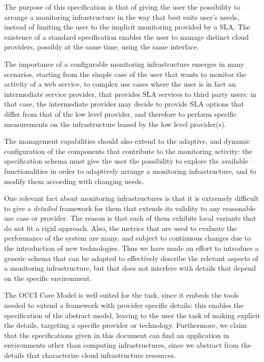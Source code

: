 \documentclass[12pt]{article}  %
\begin{document}
The purpose of this specification is that of giving the user the possibility to arrange a monitoring infrastructure in the way that best suits user's needs, instead of limiting the user to the implicit monitoring provided by a SLA. The existence of a standard specification enables the user to manage distinct cloud providers, possibly at the same time, using the same interface.

The importance of a configurable monitoring infrastructure emerges in many scenarios, starting from the simple case of the user that wants to monitor the activity of a web service, to complex use cases where the user is in fact an intermediate service provider, that provides SLA services to third party users: in that case, the intermediate provider may decide to provide SLA options that differ from that of the low level provider, and therefore to perform specific measurements on the infrastructure leased by the low level provider(s).

The management capabilities should also extend to the adaptive, and dynamic configuration of the components that contribute to the monitoring activity: the specification schema must give the user the possibility to explore the available functionalities in order to adaptively arrange a monitoring infrastructure, and to modify them according with changing needs.

One relevant fact about monitoring infrastructures is that it is extremely difficult to give a {\em detailed} framework for them that extends its validity to any reasonable use case or provider. The reason is that each of them exhibits local variants that do not fit a rigid approach. Also, the metrics that are used to evaluate the performance of the system are many, and subject to continuous changes due to the introduction of new technologies. Thus we have made an effort to introduce a generic schema that can be adapted to effectively describe the relevant aspects of a monitoring infrastructure, but that does not interfere with details that depend on the specific environment.

The OCCI Core Model \cite{occi:core} is well suited for the task, since it embeds the tools needed to extend a framework with provider specific details: this enables the specification of the abstract model, leaving to the user the task of making explicit the details, targeting a specific provider or technology. Furthermore, we claim that the specifications given in this document can find an application in environments other than computing infrastructures, since we abstract from the details that characterize cloud infrastructure resources.
\end{document}
